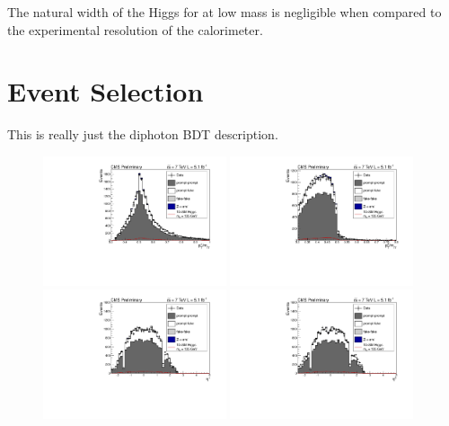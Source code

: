 The natural width of the Higgs for at low mass is negligible when compared to the experimental 
resolution of the calorimeter. 

\section{Event Selection}
\label{sec:eventselection}

This is really just the diphoton BDT description.

\begin{figure}[hbt!]
\begin{center}
  \includegraphics[width=0.48\textwidth]{hgg7TeV/variablePlots/pt_1om}
  \includegraphics[width=0.48\textwidth]{hgg7TeV/variablePlots/pt_2om}\\
  \includegraphics[width=0.48\textwidth]{hgg7TeV/variablePlots/phoeta_1}
  \includegraphics[width=0.48\textwidth]{hgg7TeV/variablePlots/phoeta_2}\\

\end{center}
\end{figure}
